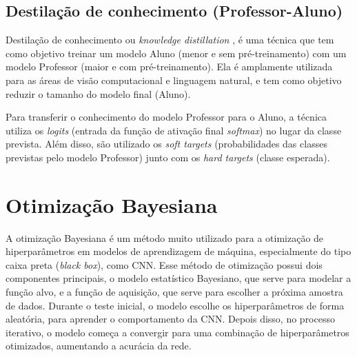 \subsection{Destilação de conhecimento (Professor-Aluno)}\label{conceitos_destilacao}

Destilação de conhecimento ou \textit{knowledge distillation} \cite{hinton2015distilling}, é uma técnica que tem
como objetivo treinar um modelo Aluno (menor e sem pré-treinamento) com um modelo Professor
(maior e com pré-treinamento). Ela é amplamente utilizada para as áreas de visão computacional e linguagem natural,
e tem como objetivo reduzir o tamanho do modelo final (Aluno).

Para transferir o conhecimento do modelo Professor para o Aluno, a técnica utiliza os \textit{logits} (entrada da
função de ativação final \textit{softmax}) no lugar da classe prevista. Além disso, são utilizado os
\textit{soft targets} (probabilidades das classes previstas pelo modelo Professor) junto com os
\textit{hard targets} (classe esperada).


\section{Otimização Bayesiana}\label{cap_conceitos_bayesiana}
A otimização Bayesiana é um método muito utilizado para a otimização de hiperparâmetros em modelos de aprendizagem de
máquina, especialmente do tipo caixa preta (\textit{black box}), como CNN.
Esse método de otimização possui dois componentes principais, o modelo estatístico Bayesiano, que serve para modelar a
função alvo, e a função de aquisição, que serve para escolher a próxima amostra de dados. \cite{frazier2018tutorial}
Durante o teste inicial, o modelo escolhe os hiperparâmetros de forma aleatória, para aprender o comportamento da CNN.
Depois disso, no processo iterativo, o modelo começa a convergir para uma combinação de hiperparâmetros otimizados,
aumentando a acurácia da rede.


